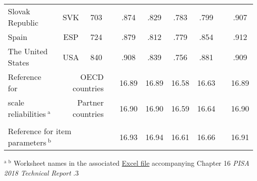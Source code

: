 {\begin{tabular}{lcc c@{\hskip 1cm} cccc c@{\hskip 1cm} c}
    Slovak Republic & SVK & 703 &       & .874 & .829 & .783 & .799 &       & .907 \\
    Spain & ESP & 724 &       & .879 & .812 & .779 & .854 &       & .912 \\
    The United States & USA & 840 &       & .908 & .839 & .756 & .881 &       & .909 \\
    \midrule
    Reference for & \multicolumn{2}{r}{OECD countries} & & 16.89 & 16.89 & 16.58 & 16.63 &       & 16.89 \\
    scale reliabilities$\ ^\text{a}$ & \multicolumn{2}{r}{Partner countries} & & 16.90 & 16.90 & 16.59 & 16.64 &       & 16.90 \\
    &&&&&&&&&\\
    \multicolumn{3}{l}{Reference for item parameters$\ ^\text{b}$} & & 16.93 & 16.94 & 16.61 & 16.66 & & 16.91\\
    \end{tabular}
}{$^\text{a}\ ^\text{b}$ Worksheet names in the associated \href{https://www.oecd.org/pisa/data/pisa2018technicalreport/PISA2018_Technical_Report_chapter-16_Background_Questionnaires.xlsx}{Excel file} accompanying Chapter 16 \textit{PISA 2018 Technical Report} \parencite{PISAtech}.}{3}
